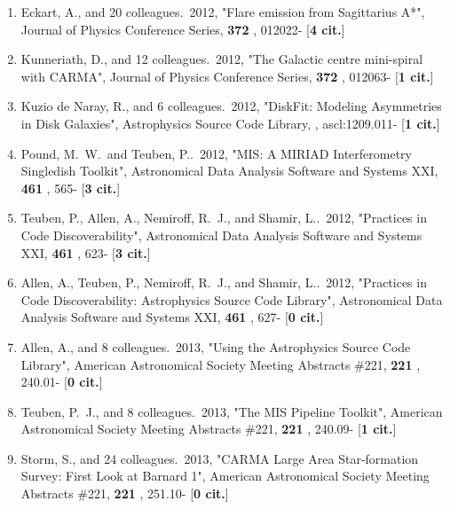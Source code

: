 \documentclass[11pt,letterpaper]{article}
\begin{document}
\begin{enumerate}[resume,label=\textbf{\arabic*}.]
\item  
Eckart, A., and 20 colleagues.\  2012,  "Flare emission from Sagittarius 
A*", Journal of Physics Conference Series,  {\bf 372} , 012022- [{\bf 4 
cit.}] 

\item  
Kunneriath, D., and 12 colleagues.\  2012,  "The Galactic centre 
mini-spiral with CARMA", Journal of Physics Conference Series,  {\bf 372} , 
012063- [{\bf 1 cit.}] 

\item  
Kuzio de Naray, R., and 6 colleagues.\  2012,  "DiskFit: Modeling 
Asymmetries in Disk Galaxies", Astrophysics Source Code Library,  , 
ascl:1209.011- [{\bf 1 cit.}] 

\item  
Pound, M.~W.~and Teuben, P..\  2012,  "MIS: A MIRIAD Interferometry 
Singledish Toolkit", Astronomical Data Analysis Software and Systems XXI,  
{\bf 461} , 565- [{\bf 3 cit.}] 

\item  
Teuben, P., Allen, A., Nemiroff, R.~J., and Shamir, L..\  2012,  "Practices 
in Code Discoverability", Astronomical Data Analysis Software and Systems 
XXI,  {\bf 461} , 623- [{\bf 3 cit.}] 

\item  
Allen, A., Teuben, P., Nemiroff, R.~J., and Shamir, L..\  2012,  "Practices 
in Code Discoverability: Astrophysics Source Code Library", Astronomical 
Data Analysis Software and Systems XXI,  {\bf 461} , 627- [{\bf 0 cit.}] 


\item  
Allen, A., and 8 colleagues.\  2013,  "Using the Astrophysics Source Code 
Library", American Astronomical Society Meeting Abstracts \#221,  {\bf 221} 
, 240.01- [{\bf 0 cit.}] 

\item  
Teuben, P.~J., and 8 colleagues.\  2013,  "The MIS Pipeline Toolkit", 
American Astronomical Society Meeting Abstracts \#221,  {\bf 221} , 240.09- 
[{\bf 1 cit.}] 

\item  
Storm, S., and 24 colleagues.\  2013,  "CARMA Large Area Star-formation 
Survey: First Look at Barnard 1", American Astronomical Society Meeting 
Abstracts \#221,  {\bf 221} , 251.10- [{\bf 0 cit.}] 


\end{enumerate}
\end{document}
